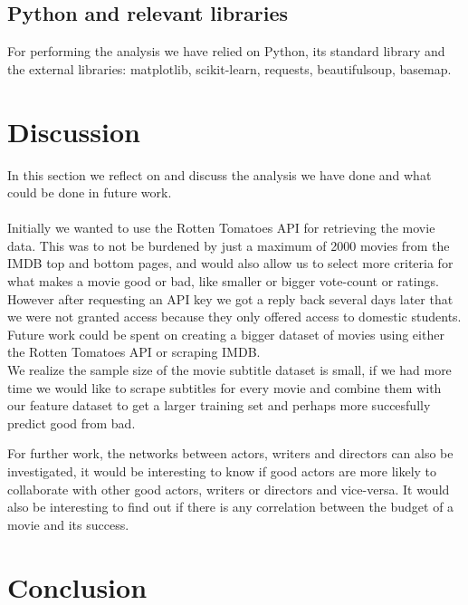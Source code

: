 \documentclass{acm_proc_article-sp}
\begin{document}
\subsection{Python and relevant libraries}
For performing the analysis we have relied on Python, its standard library and the external libraries: matplotlib, scikit-learn, requests, beautifulsoup, basemap.

\section{Discussion}
In this section we reflect on and discuss the analysis we have done and what could be done in future work.\\\\

Initially we wanted to use the Rotten Tomatoes API\cite{tomatoes} for retrieving the movie data. This was to not be burdened by just a maximum of 2000 movies from the IMDB top and bottom pages, and would also allow us to select more criteria for what makes a movie good or bad, like smaller or bigger vote-count or ratings. However after requesting an API key we got a reply back several days later that we were not granted access because they only offered access to domestic students. Future work could be spent on creating a bigger dataset of movies using either the Rotten Tomatoes API or scraping IMDB.\\

We realize the sample size of the movie subtitle dataset is small, if we had more time we would like to scrape subtitles for every movie and combine them with our feature dataset to get a larger training set and perhaps more succesfully predict good from bad.

For further work, the networks between actors, writers and directors can also be investigated, it would be interesting to know if good actors are more likely to collaborate with other good actors, writers or directors and vice-versa.
It would also be interesting to find out if there is any correlation between the budget of a movie and its success.

\section{Conclusion}
\end{document}
